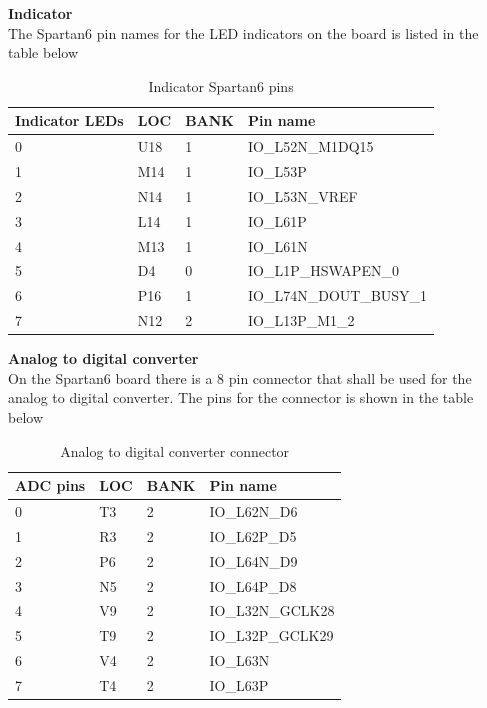 \textbf{Indicator}\\
The Spartan6 pin names for the LED indicators on the board is listed in the table below
\begin{table}[H]
    \begin{tabular}{|p{3cm}|p{3cm}|p{3cm}|p{5cm}|}
        \hline
        \textbf{Indicator LEDs} & \textbf{LOC} & \textbf{BANK} & \textbf{Pin name}   \\ \hline
        0                       & U18          & 1             & IO\_L52N\_M1DQ15      \\ \hline
        1                       & M14          & 1             & IO\_L53P             \\ \hline
        2                       & N14          & 1             & IO\_L53N\_VREF        \\ \hline
        3                       & L14          & 1             & IO\_L61P             \\ \hline
        4                       & M13          & 1             & IO\_L61N             \\ \hline
        5                       & D4           & 0             & IO\_L1P\_HSWAPEN\_0    \\ \hline
        6                       & P16          & 1             & IO\_L74N\_DOUT\_BUSY\_1 \\ \hline
        7                       & N12          & 2             & IO\_L13P\_M1\_2        \\
        \hline
    \end{tabular}
    \caption{Indicator Spartan6 pins}
\end{table}

\textbf{Analog to digital converter}\\
On the Spartan6 board there is a 8 pin connector that shall be used for the analog to digital converter. The pins for the connector is shown in the table below
\begin{table}[H]
    \begin{tabular}{|p{3cm}|p{3cm}|p{3cm}|p{5cm}|}
        \hline
        \textbf{ADC pins} & \textbf{LOC} & \textbf{BANK} & \textbf{Pin name}   \\ \hline
        0 & T3 & 2 & IO\_L62N\_D6     \\ \hline
        1 & R3 & 2 & IO\_L62P\_D5     \\ \hline
        2 & P6 & 2 & IO\_L64N\_D9     \\ \hline
        3 & N5 & 2 & IO\_L64P\_D8     \\ \hline
        4 & V9 & 2 & IO\_L32N\_GCLK28 \\ \hline
        5 & T9 & 2 & IO\_L32P\_GCLK29 \\ \hline
        6 & V4 & 2 & IO\_L63N        \\ \hline
        7 & T4 & 2 & IO\_L63P        \\
        \hline
    \end{tabular}
    \caption{Analog to digital converter connector}
\end{table}

